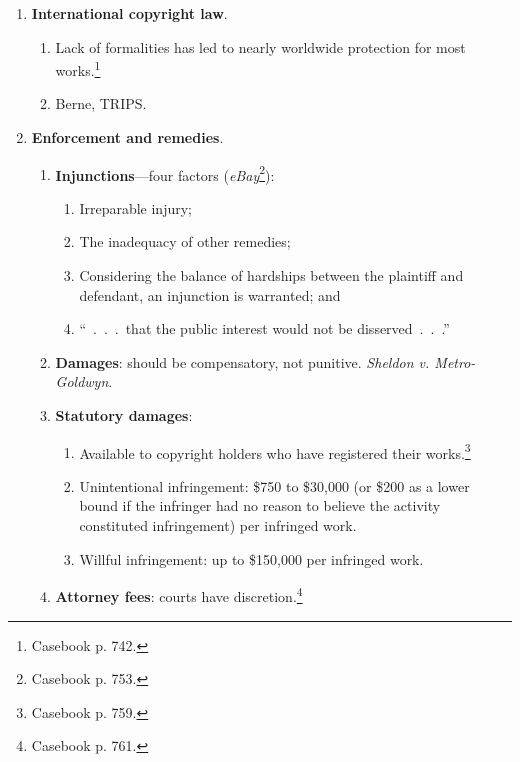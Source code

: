 \begin{enumerate}
\begin{enumerate}
\begin{enumerate}
        \end{enumerate}
    \end{enumerate}
    \item \textbf{International copyright law}.
    \begin{enumerate}
        \item Lack of formalities has led to nearly worldwide protection for 
        most works.\footnote{Casebook p. 742.}
        \item Berne, TRIPS.
    \end{enumerate}
    \item \textbf{Enforcement and remedies}.
    \begin{enumerate}
        \item \textbf{Injunctions}---four factors 
        (\emph{eBay}\footnote{Casebook p. 753.}):
        \begin{enumerate}
            \item Irreparable injury;
            \item The inadequacy of other remedies;
            \item Considering the balance of hardships between the plaintiff 
            and defendant, an injunction is warranted; and
            \item ``~.~.~.~that the public interest would not be 
            disserved~.~.~.''
        \end{enumerate}
        \item \textbf{Damages}: should be compensatory, not punitive.  
        \emph{Sheldon v. Metro-Goldwyn}.
        \item \textbf{Statutory damages}:
        \begin{enumerate}
            \item Available to copyright holders who have registered their 
            works.\footnote{Casebook p. 759.}
            \item Unintentional infringement: \$750 to \$30,000 (or \$200 as a 
            lower bound if the infringer had no reason to believe the activity 
            constituted infringement) per infringed work.
            \item Willful infringement: up to \$150,000 per infringed work.
        \end{enumerate}
        \item \textbf{Attorney fees}: courts have 
        discretion.\footnote{Casebook p. 761.}
    \end{enumerate}
\end{enumerate}

